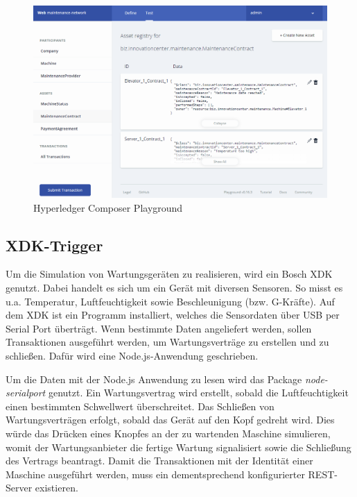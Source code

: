 \begin{figure}[!htbp]
    \centering
      \includegraphics[width=1.0\textwidth,angle=0]{images/playground}
       \caption{Hyperledger Composer Playground}
      \label{fig:playground}
\end{figure}

\subsection{XDK-Trigger}
Um die Simulation von Wartungsgeräten zu realisieren, wird ein Bosch XDK genutzt. Dabei handelt es sich um ein Gerät mit diversen Sensoren. So misst es u.a. Temperatur, Luftfeuchtigkeit sowie Beschleunigung (bzw. G-Kräfte). Auf dem XDK ist ein Programm installiert, welches die Sensordaten über USB per Serial Port überträgt. Wenn bestimmte Daten angeliefert werden, sollen Transaktionen ausgeführt werden, um Wartungsverträge zu erstellen und zu schließen. Dafür wird eine Node.js-Anwendung geschrieben.

Um die Daten mit der Node.js Anwendung zu lesen wird das Package \textit{node-serialport} \cite{NodeSerialportTeamnodeserialportGithubRepository2018} genutzt. Ein Wartungsvertrag wird erstellt, sobald die Luftfeuchtigkeit einen bestimmten Schwellwert überschreitet. Das Schließen von Wartungsverträgen erfolgt, sobald das Gerät auf den Kopf gedreht wird. Dies würde das Drücken eines Knopfes an der zu wartenden Maschine simulieren, womit der Wartungsanbieter die fertige Wartung signalisiert sowie die Schließung des Vertrags beantragt. Damit die Transaktionen mit der Identität einer Maschine ausgeführt werden, muss ein dementsprechend konfigurierter REST-Server existieren. 

